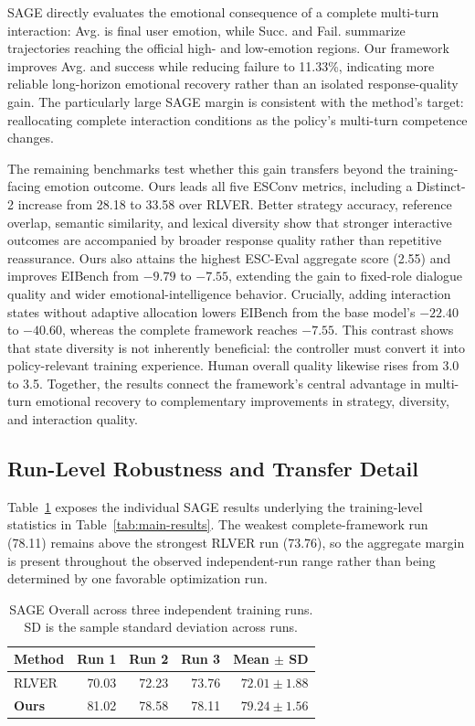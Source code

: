 \documentclass[letterpaper]{article}
\begin{document}
SAGE directly evaluates the emotional consequence of a complete multi-turn interaction: Avg. is final user emotion, while Succ. and Fail. summarize trajectories reaching the official high- and low-emotion regions. Our framework improves Avg. and success while reducing failure to 11.33\%, indicating more reliable long-horizon emotional recovery rather than an isolated response-quality gain. The particularly large SAGE margin is consistent with the method's target: reallocating complete interaction conditions as the policy's multi-turn competence changes.

The remaining benchmarks test whether this gain transfers beyond the training-facing emotion outcome. Ours leads all five ESConv metrics, including a Distinct-2 increase from 28.18 to 33.58 over RLVER. Better strategy accuracy, reference overlap, semantic similarity, and lexical diversity show that stronger interactive outcomes are accompanied by broader response quality rather than repetitive reassurance. Ours also attains the highest ESC-Eval aggregate score (2.55) and improves EIBench from $-9.79$ to $-7.55$, extending the gain to fixed-role dialogue quality and wider emotional-intelligence behavior. Crucially, adding interaction states without adaptive allocation lowers EIBench from the base model's $-22.40$ to $-40.60$, whereas the complete framework reaches $-7.55$. This contrast shows that state diversity is not inherently beneficial: the controller must convert it into policy-relevant training experience. Human overall quality likewise rises from 3.0 to 3.5. Together, the results connect the framework's central advantage in multi-turn emotional recovery to complementary improvements in strategy, diversity, and interaction quality.

\subsection{Run-Level Robustness and Transfer Detail}
Table~\ref{tab:independent-runs} exposes the individual SAGE results underlying the training-level statistics in Table~\ref{tab:main-results}. The weakest complete-framework run (78.11) remains above the strongest RLVER run (73.76), so the aggregate margin is present throughout the observed independent-run range rather than being determined by one favorable optimization run.

\begin{table}[t]
\centering
\small
\begin{tabular}{lrrrr}
\toprule
Method & Run 1 & Run 2 & Run 3 & Mean $\pm$ SD \\
\midrule
RLVER & 70.03 & 72.23 & 73.76 & $72.01\pm1.88$ \\
\textbf{Ours} & 81.02 & 78.58 & 78.11 & $\mathbf{79.24\pm1.56}$ \\
\bottomrule
\end{tabular}
\caption{SAGE Overall across three independent training runs. SD is the sample standard deviation across runs.}
\label{tab:independent-runs}
\end{table}
\end{document}
